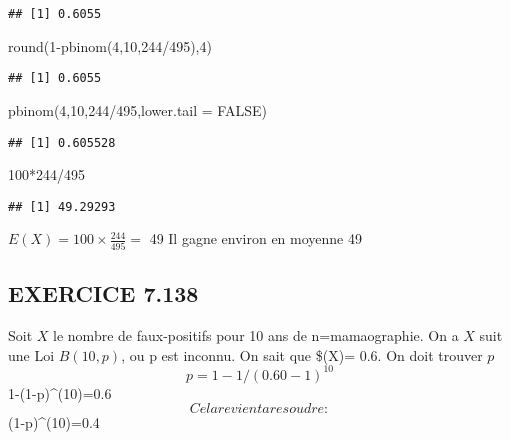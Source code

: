 \documentclass[
]{article}
\newenvironment{Shaded}{\begin{snugshade}}{\end{snugshade}}
\newcommand{\AttributeTok}[1]{\textcolor[rgb]{0.77,0.63,0.00}{#1}}
\newcommand{\ConstantTok}[1]{\textcolor[rgb]{0.00,0.00,0.00}{#1}}
\newcommand{\DecValTok}[1]{\textcolor[rgb]{0.00,0.00,0.81}{#1}}
\newcommand{\FunctionTok}[1]{\textcolor[rgb]{0.00,0.00,0.00}{#1}}
\newcommand{\NormalTok}[1]{#1}
\newcommand{\SpecialCharTok}[1]{\textcolor[rgb]{0.00,0.00,0.00}{#1}}
\begin{document}
\begin{verbatim}
## [1] 0.6055
\end{verbatim}

\begin{Shaded}
\begin{Highlighting}[]
\FunctionTok{round}\NormalTok{(}\DecValTok{1}\SpecialCharTok{{-}}\FunctionTok{pbinom}\NormalTok{(}\DecValTok{4}\NormalTok{,}\DecValTok{10}\NormalTok{,}\DecValTok{244}\SpecialCharTok{/}\DecValTok{495}\NormalTok{),}\DecValTok{4}\NormalTok{)}
\end{Highlighting}
\end{Shaded}

\begin{verbatim}
## [1] 0.6055
\end{verbatim}

\begin{Shaded}
\begin{Highlighting}[]
\FunctionTok{pbinom}\NormalTok{(}\DecValTok{4}\NormalTok{,}\DecValTok{10}\NormalTok{,}\DecValTok{244}\SpecialCharTok{/}\DecValTok{495}\NormalTok{,}\AttributeTok{lower.tail =} \ConstantTok{FALSE}\NormalTok{)}
\end{Highlighting}
\end{Shaded}

\begin{verbatim}
## [1] 0.605528
\end{verbatim}

\begin{Shaded}
\begin{Highlighting}[]
\DecValTok{100}\SpecialCharTok{*}\DecValTok{244}\SpecialCharTok{/}\DecValTok{495}
\end{Highlighting}
\end{Shaded}

\begin{verbatim}
## [1] 49.29293
\end{verbatim}

\(E(X)=100\times \frac{244}{495}=\) 49 Il gagne environ en moyenne 49

\hypertarget{exercice-7.138}{%
\subsection{EXERCICE 7.138}\label{exercice-7.138}}

Soit \(X\) le nombre de faux-positifs pour 10 ans de n=mamaographie. On
a \(X\) suit une Loi \(B(10,p)\), ou p est inconnu. On sait que
\$\Pr(X)= 0.6. On doit trouver \(p\) \[
p=1-1/(0.60-1)^10
\] 1-(1-p)\^{}(10)=0.6 \[
Cela revient a resoudre:
\] (1-p)\^{}(10)=0.4
\end{document}
